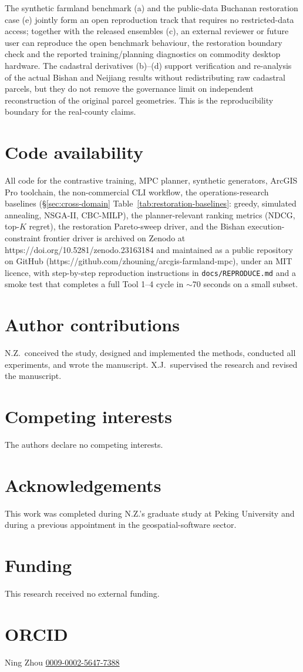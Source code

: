 \documentclass[11pt]{article}
\begin{document}
The synthetic farmland benchmark (a) and the public-data Buchanan restoration case (e) jointly form an open reproduction track that requires no restricted-data access; together with the released ensembles (c), an external reviewer or future user can reproduce the open benchmark behaviour, the restoration boundary check and the reported training/planning diagnostics on commodity desktop hardware. The cadastral derivatives (b)--(d) support verification and re-analysis of the actual Bishan and Neijiang results without redistributing raw cadastral parcels, but they do not remove the governance limit on independent reconstruction of the original parcel geometries. This is the reproducibility boundary for the real-county claims.

\section*{Code availability}
All code for the contrastive training, MPC planner, synthetic generators, ArcGIS Pro toolchain, the non-commercial CLI workflow, the operations-research baselines (\S\ref{sec:cross-domain} Table~\ref{tab:restoration-baselines}: greedy, simulated annealing, NSGA-II, CBC-MILP), the planner-relevant ranking metrics (NDCG, top-$K$ regret), the restoration Pareto-sweep driver, and the Bishan execution-constraint frontier driver is archived on Zenodo at https://doi.org/10.5281/zenodo.23163184 and maintained as a public repository on GitHub (https://github.com/zhouning/arcgis-farmland-mpc), under an MIT licence, with step-by-step reproduction instructions in \texttt{docs/REPRODUCE.md} and a smoke test that completes a full Tool 1--4 cycle in $\sim$70 seconds on a small subset.

\section*{Author contributions}
N.Z.\ conceived the study, designed and implemented the methods, conducted all experiments, and wrote the manuscript. X.J.\ supervised the research and revised the manuscript.

\section*{Competing interests}
The authors declare no competing interests.



\section*{Acknowledgements}
This work was completed during N.Z.'s graduate study at Peking University and during a previous appointment in the geospatial-software sector.

\section*{Funding}
This research received no external funding.

\section*{ORCID}
Ning Zhou \href{https://orcid.org/0009-0002-5647-7388}{0009-0002-5647-7388}







\end{document}
